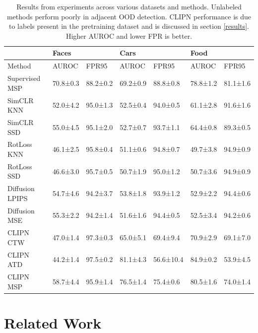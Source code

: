 \documentclass{article} %
\theoremstyle{plain}
\theoremstyle{definition}
\theoremstyle{remark}
\begin{document}
\begin{table}[]

\caption{Results from experiments across various datasets and methods. Unlabeled methods perform poorly in adjacent OOD detection. CLIPN performance is due to labels present in the pretraining dataset and is discussed in section \ref{results}. Higher AUROC and lower FPR is better.  }
\vspace{2mm}
\centering
\begin{tabular}{l|ll|ll|ll}
\toprule
                & Faces    &          & Cars     &           & Food     &          \\ \hline
Method          & AUROC    & FPR95    & AUROC    & FPR95     & AUROC    & FPR95    \\ \midrule
Supervised MSP  & 70.8±0.3 & 88.2±0.2 & 69.2±0.9 & 88.8±0.8  & 78.8±1.2 & 81.1±1.6 \\ \midrule
SimCLR KNN      & 52.0±4.2 & 95.0±1.3 & 52.5±0.4 & 94.0±0.5  & 61.1±2.8 & 91.6±1.6 \\
SimCLR SSD      & 55.0±4.5 & 95.1±2.0 & 52.7±0.7 & 93.7±1.1  & 64.4±0.8 & 89.3±0.5 \\
RotLoss KNN     & 46.1±2.5 & 95.8±0.4 & 51.1±0.6 & 94.8±0.7  & 49.7±3.8 & 94.9±0.9 \\
RotLoss SSD     & 46.6±3.0 & 95.7±0.5 & 50.7±1.9 & 95.0±1.2  & 50.7±3.6 & 94.9±0.9 \\ \midrule
Diffusion LPIPS & 54.7±4.6 & 94.2±3.7 & 53.8±1.8 & 93.9±1.2  & 52.9±2.2 & 94.4±0.6 \\
Diffusion MSE   & 55.3±2.2 & 94.2±1.4 & 51.6±1.6 & 94.4±0.5  & 52.5±3.4 & 94.2±0.6 \\ \midrule
CLIPN CTW       & 47.0±1.4   & 97.3±0.3 & 65.0±5.1   & 69.4±9.4  & 70.9±2.9 & 69.1±7.0   \\
CLIPN ATD       & 44.2±1.4 & 97.5±0.2 & 81.1±4.3 & 56.6±10.4 & 84.9±0.2 & 53.9±4.5 \\
CLIPN MSP       & 58.7±4.4 & 95.9±1.4 & 76.5±1.4 & 75.4±0.6  & 80.5±1.6 & 74.0±1.4   \\ \bottomrule
\end{tabular}

\label{tab:results}
\end{table}


\renewcommand{\bfdefault}{bx}

\vspace{-2mm}\section{Related Work}\vspace{-2mm}
\end{document}
